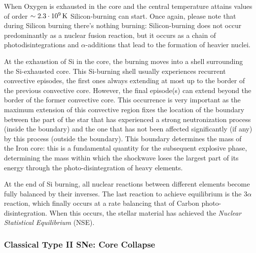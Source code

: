 \par When Oxygen is exhausted in the core and the central temperature attains values of order $\sim 2.3\cdot 10^{9}\,\text{K}$ Silicon-burning can start. Once again, please note that during Silicon burning there's nothing burning: Silicon-burning does not occur predominantly as a nuclear fusion reaction, but it occurs as a chain of photodisintegrations and $\alpha$-additions that lead to the formation of heavier nuclei.
\par At the exhaustion of Si in the core, the burning moves into a shell surrounding the Si-exhausted core. This Si-burning shell usually experiences recurrent convective episodes, the first ones always extending at most up to the border of the previous convective core. However, the final episode(s) can extend beyond the border of the former convective core. This occurrence is very important as the maximum extension of this convective region fixes the location of the boundary between the part of the star that has experienced a strong neutronization process (inside the boundary) and the one that has not been affected significantly (if any) by this process (outside the boundary). This boundary determines the mass of the Iron core: this is a fundamental quantity for the subsequent explosive phase, determining the mass within which the shockwave loses the largest part of its energy through the photo-disintegration of heavy elements.

\begin{tcolorbox}[enhanced,attach boxed title to top center={yshift=-3mm,yshifttext=-1mm},
colback=blue!5!white,colframe=blue!75!black,colbacktitle=blue!80!black,
title=Nuclear Statistical Equilibrium (NSE),
boxed title style={size=small,colframe=blue!50!black}]
    At the end of Si burning, all nuclear reactions between different elements become fully balanced by their inverses. The last reaction to achieve equilibrium is the $3\alpha$ reaction, which finally occurs at a rate balancing that of Carbon photo-disintegration. When this occurs, the stellar material has achieved the \emph{Nuclear Statistical Equilibrium} (NSE).
\end{tcolorbox}

\subsubsection{Classical Type II SNe: Core Collapse}

